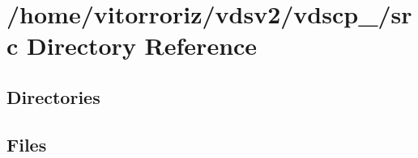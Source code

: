 \section{/home/vitorroriz/vdsv2/vdscp\+\_/src Directory Reference}
\label{dir_68267d1309a1af8e8297ef4c3efbcdba}
\subsection*{Directories}
\begin{DoxyCompactItemize}
\end{DoxyCompactItemize}
\subsection*{Files}
\begin{DoxyCompactItemize}
\end{DoxyCompactItemize}
